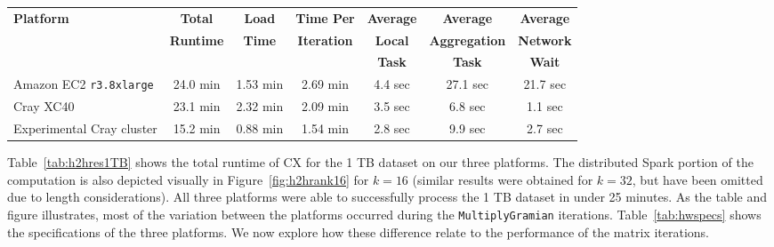     \begin{table*}
    \begin{center}
    \begin{tabular}{| l | c | c | c | c | c | c |}
    \toprule
    \textbf{Platform} & \textbf{Total} & \textbf{Load} & \textbf{Time Per} & \textbf{Average} & \textbf{Average} & \textbf{Average} \\
                               & \textbf{Runtime} & \textbf{Time} & \textbf{Iteration} & \textbf{Local} & \textbf{Aggregation} & \textbf{Network} \\
                               & & & & \textbf{Task} & \textbf{Task} & \textbf{Wait} \\
    \midrule
    Amazon EC2 \texttt{r3.8xlarge} & 24.0 min & 1.53 min & 2.69 min & 4.4 sec & 27.1 sec & 21.7 sec \\
    \midrule
    Cray XC40 & 23.1 min& 2.32 min & 2.09 min &  3.5 sec & 6.8 sec & 1.1 sec \\
    \midrule
    Experimental Cray cluster & 15.2 min & 0.88 min & 1.54 min &  2.8 sec & 9.9 sec & 2.7 sec \\
   \bottomrule
    \end{tabular}
    \end{center}
    \caption{Total runtime for the 1 TB dataset ($k=16$), broken down into load time and per-iteration time. The per-iteration time is further broken down into the average time for each task of the local stage and each task of the aggregation stage.  We also show the average amount of time spent waiting for a network fetch, to illustrate the impact of the interconnect.}
    \label{tab:h2hres1TB}
    \end{table*}
    
Table~\ref{tab:h2hres1TB} shows the total runtime of CX for the 1 TB dataset on
our three platforms.  The distributed Spark portion of the computation is also
depicted visually in Figure~\ref{fig:h2hrank16} for $k=16$ (similar results
were obtained for $k=32$, but have been omitted due to length considerations).
All three platforms were able to successfully process the 1 TB dataset 
in under 25 minutes.  As the table and figure illustrates, most of the
variation between the platforms occurred during the \texttt{MultiplyGramian}
iterations.  Table~\ref{tab:hwspecs} shows the specifications of the three
platforms. 
We now explore how these difference relate to the
performance of the matrix iterations.


